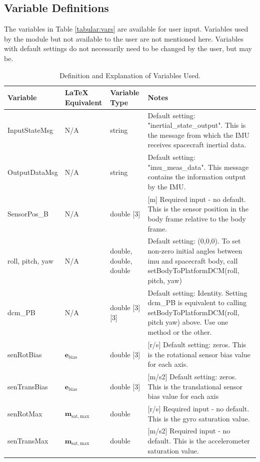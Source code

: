 \subsection{Variable Definitions}
The variables in Table \ref{tabular:vars} are available for user input. Variables used by the module but not available to the user are not mentioned here. Variables with default settings do not necessarily need to be changed by the user, but may be.
\begin{table}[H]
	\caption{Definition and Explanation of Variables Used.}
	\label{tab:errortol}
	\centering \fontsize{10}{10}\selectfont
	\begin{tabular}{ | m{3cm}| m{3cm} | m{3cm} | m{6cm} |} %
		\hline
		\textbf{Variable}   							& \textbf{LaTeX Equivalent} 	&		\textbf{Variable Type} & \textbf{Notes}			  \\ \hline
		InputStateMsg&N/A		   & string & Default setting: "inertial\_state\_output". This is the message from which the IMU receives spacecraft inertial data.\\ \hline
		OutputDataMsg & N/A & string & Default setting: "imu\_meas\_data". This message contains the information output by the IMU. \\ \hline
		SensorPos\_B & N/A & double [3] & [m] Required input - no default. This is the sensor position in the body frame relative to the body frame.\\ \hline
		roll, pitch, yaw & N/A  & double, double, double& Default setting: (0,0,0). To set non-zero initial angles between imu and spacecraft body, call setBodyToPlatformDCM(roll, pitch, yaw) \\ \hline
		dcm\_PB & N/A & double [3][3] & Default setting: Identity. Setting dcm\_PB is equivalent to calling setBodyToPlatformDCM(roll, pitch yaw) above. Use one method or the other. \\ \hline
		senRotBias & $\mathbf{e}_{\mathrm{bias}}$ & double [3] & [r/s] Default setting: zeros. This is the rotational sensor bias value for each axis. \\ \hline
		senTransBias & $\mathbf{e}_{\mathrm{bias}}$ & double [3] & [m/s2] Default setting: zeros. This is the translational sensor bias value for each axis \\ \hline
		senRotMax & $\mathbf{m}_{\mathrm{sat,max}}$& double & [r/s] Required input - no default. This is the gyro saturation value. \\ \hline
		senTransMax & $\mathbf{m}_{\mathrm{sat,max}}$ & double & [m/s2] Required input - no default. This is the accelerometer saturation value. \\ \hline

\end{tabular}
\end{table}
